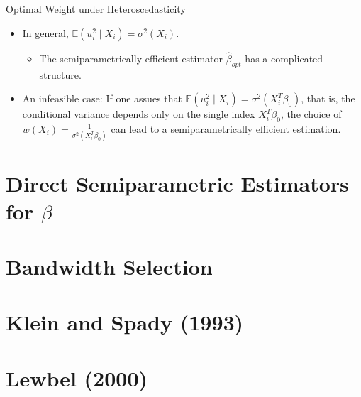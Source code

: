 \documentclass[xcolor=svgnames,dvipdfmx,cjk]{beamer}
\theoremstyle{example}
\def\E{\mathbb{E}}
\begin{document}
\begin{frame}{Optimal Weight under Heteroscedasticity}
  \begin{itemize}
    \item In general, $\E(u_i^2 \mid X_i) = \sigma^2(X_i)$.
      \begin{itemize}
        \item The semiparametrically efficient estimator $\hat{\beta}_{opt}$ has a complicated structure.
      \end{itemize}
    \item \alert{An infeasible case}: 
          If one assues that  $\E(u_i^2 \mid X_i) = \sigma^2(X_i^{T}\beta_0)$,
          that is, the conditional variance depends only on the single index $X_i^{T}\beta_0$,
          the choice of $w(X_i) = \frac{1}{\sigma^2({X_i^{T}\beta_0})}$ can lead to a semiparametrically efficient estimation.
  \end{itemize}
\end{frame}



\section{Direct Semiparametric Estimators for $\beta$}










\section{Bandwidth Selection}









\section{Klein and Spady (1993)}









\section{Lewbel (2000)}
\end{document}

